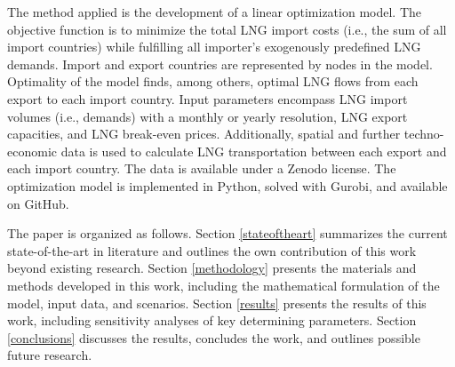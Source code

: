 The method applied is the development of a linear optimization model. The objective function is to minimize the total LNG import costs (i.e., the sum of all import countries) while fulfilling all importer's exogenously predefined LNG demands. Import and export countries are represented by nodes in the model. Optimality of the model finds, among others, optimal LNG flows from each export to each import country. Input parameters encompass LNG import volumes (i.e., demands) with a monthly or yearly resolution, LNG export capacities, and LNG break-even prices. Additionally, spatial and further techno-economic data is used to calculate LNG transportation between each export and each import country. The data is available under a Zenodo license. The optimization model is implemented in Python, solved with Gurobi, and available on GitHub.\vspace{0.35cm}   

The paper is organized as follows. Section \ref{stateoftheart} summarizes the current state-of-the-art in literature and outlines the own contribution of this work beyond existing research. Section \ref{methodology} presents the materials and methods developed in this work, including the mathematical formulation of the model, input data, and scenarios. Section \ref{results} presents the results of this work, including sensitivity analyses of key determining parameters. Section \ref{conclusions} discusses the results, concludes the work, and outlines possible future research.
